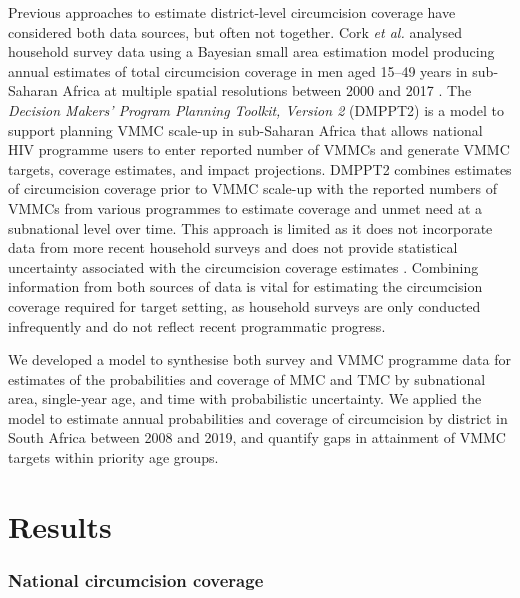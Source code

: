 \documentclass{article}
\begin{document}
Previous approaches to estimate district-level circumcision coverage have considered both data sources, but often not together. Cork \textit{et al.} analysed household survey data using a Bayesian small area estimation model producing annual estimates of total circumcision coverage in men aged 15--49 years in sub-Saharan Africa at multiple spatial resolutions between 2000 and 2017 \cite{cork2020mapping}. The \textit{Decision Makers' Program Planning Toolkit, Version 2} (DMPPT2) is a model to support planning VMMC scale-up in sub-Saharan Africa that allows national HIV programme users to enter reported number of VMMCs and generate VMMC targets, coverage estimates, and impact projections. DMPPT2 combines estimates of circumcision coverage prior to VMMC scale-up with the reported numbers of VMMCs from various programmes to estimate coverage and unmet need at a subnational level over time. This approach is limited as it does not incorporate data from more recent household surveys and does not provide statistical uncertainty associated with the circumcision coverage estimates \cite{kripke2016age, kripke2016cost}. Combining information from both sources of data is vital for estimating the circumcision coverage required for target setting, as household surveys are only conducted infrequently and do not reflect recent programmatic progress.

We developed a model to synthesise both survey and VMMC programme data for estimates of the probabilities and coverage of MMC and TMC by subnational area, single-year age, and time with probabilistic uncertainty. We applied the model to estimate annual probabilities and coverage of circumcision by district in South Africa between 2008 and 2019, and quantify gaps in attainment of VMMC targets within priority age groups.


\section*{Results}


\subsubsection*{National circumcision coverage}
\end{document}
